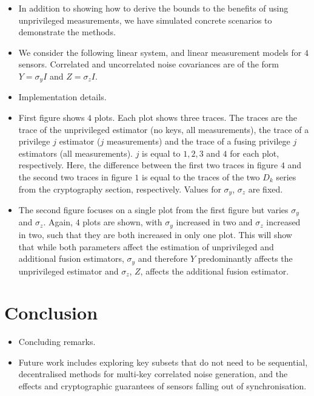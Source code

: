 \documentclass[conference]{IEEEtran}
\theoremstyle{definition}
\theoremstyle{remark}
\begin{document}
\begin{itemize}
  \item In addition to showing how to derive the bounds to the benefits of using unprivileged measurements, we have simulated concrete scenarios to demonstrate the methods.
  \item We consider the following linear system, and linear measurement models for $4$ sensors. Correlated and uncorrelated noise covariances are of the form $Y=\sigma_y I$ and $Z = \sigma_z I$.
  \item Implementation details.
  \item First figure shows $4$ plots. Each plot shows three traces. The traces are the trace of the unprivileged estimator (no keys, all measurements), the trace of a privilege $j$ estimator ($j$ measurements) and the trace of a fusing privilege $j$ estimators (all measurements). $j$ is equal to $1,2,3$ and $4$ for each plot, respectively. Here, the difference between the first two traces in figure $4$ and the second two traces in figure $1$ is equal to the traces of the two $D_k$ series from the cryptography section, respectively. Values for $\sigma_y$, $\sigma_z$ are fixed.
  \item The second figure focuses on a single plot from the first figure but varies $\sigma_y$ and $\sigma_z$. Again, $4$ plots are shown, with $\sigma_y$ increased in two and $\sigma_z$ increased in two, such that they are both increased in only one plot. This will show that while both parameters affect the estimation of unprivileged and additional fusion estimators, $\sigma_y$ and therefore $Y$ predominantly affects the unprivileged estimator and $\sigma_z$, $Z$, affects the additional fusion estimator.
\end{itemize}

% 
%                                               
%                                               
%                                               
% 

\section{Conclusion}\label{sec:conc}
\begin{itemize}
  \item Concluding remarks.
  \item Future work includes exploring key subsets that do not need to be sequential, decentralised methods for multi-key correlated noise generation, and the effects and cryptographic guarantees of sensors falling out of synchronisation.
\end{itemize}
\end{document}
